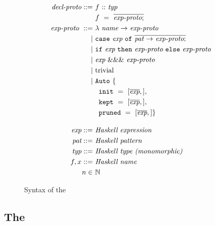 \begin{figure}
\begin{align*}
  \textit{decl-proto} ::= &
  ~ f ~ \mathtt{::} ~ \textit{typ} \\ &
  ~ f ~ = ~ \overline{\textit{exp-proto} ;}
  \\
  \textit{exp-proto}~ ::= &
    ~ \mathtt{\lambda} ~ \textit{name} ~ \mathtt{\rightarrow} ~ \textit{exp-proto} \\ \mid &
    ~ \mathtt{case} ~ \textit{exp} ~ \mathtt{of} ~ \overline{\textit{pat} ~ \mathtt{\rightarrow} ~ \textit{exp-proto} ;} \\ \mid &
    ~ \mathtt{if} ~ \textit{exp} ~ \mathtt{then} ~ \textit{exp-proto} ~ \mathtt{else} ~ \textit{exp-proto} \\ \mid &
    ~ \textit{exp} ~ \&\&\& ~ \textit{exp-proto} \\ \mid &
    ~ \text{trivial} \\ \mid &
    ~ \mathtt{Auto} ~ \{ \\ &
    ~ \hspace{0.5em} \texttt{init}~=~[\overline{\textit{exp}},], \\ &
    ~ \hspace{0.5em} \texttt{kept}~=~[\overline{\textit{exp}},], \\ &
    ~ \hspace{0.5em} \texttt{pruned}~=~[\overline{\textit{exp}},] \} 
  \\[1em]
  \textit{exp} ::= & ~ \textit{Haskell expression} 
  \\
  \textit{pat} ::= & ~ \textit{Haskell pattern} 
  \\
  \textit{typ} ::= & ~ \textit{Haskell type (monomorphic)} 
  \\
  f, x ::= & ~ \textit{Haskell name} 
  \\
  n \in & ~ \mathbb{N}
\end{align*}
\caption{Syntax of the \LangB}
\label{fig:langb-syntax}
\end{figure}


\subsection{The \LangB}
\label{sec:proto-proof}

